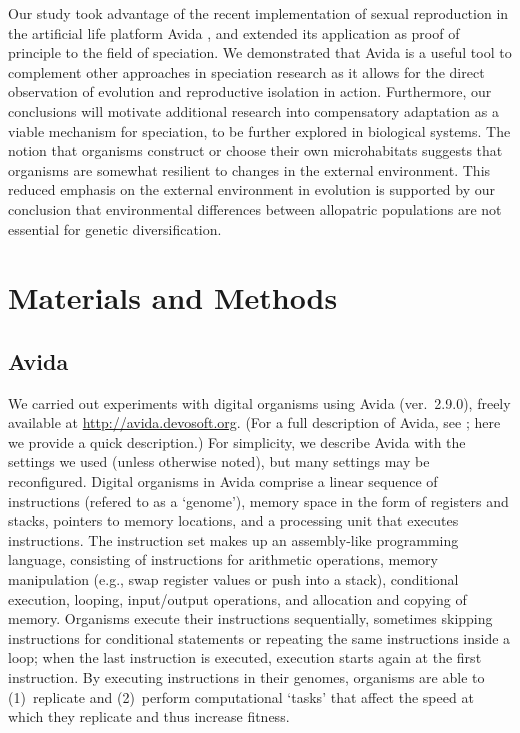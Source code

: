\documentclass[11pt]{article}
\begin{document}
Our study took advantage
of the recent implementation of sexual reproduction
in the artificial life platform Avida \cite{mis06},
and extended its application
as proof of principle to the field of speciation.
%
We demonstrated that Avida is a useful tool to complement
other approaches in speciation research as it allows for
the direct observation of evolution and reproductive isolation in action.
%
Furthermore, our conclusions will motivate additional research
into compensatory adaptation as a viable mechanism for speciation,
to be further explored in biological systems.
%
The notion that organisms construct or choose
their own microhabitats \cite{lew00}
suggests that organisms are somewhat
resilient to changes in the external environment.
%
This reduced emphasis on the external environment in evolution
is supported by our conclusion that environmental differences
between allopatric populations are not essential for genetic diversification.



\section*{Materials and Methods}

\subsection*{Avida}

We carried out experiments with digital organisms using Avida (ver.~2.9.0),
freely available at \url{http://avida.devosoft.org}.
%
(For a full description of Avida, see \cite{ofr04};
here we provide a quick description.)
%
For simplicity, we describe Avida with the settings we used
(unless otherwise noted), but many settings may be reconfigured.
%
Digital organisms in Avida comprise a linear sequence of instructions
(refered to as a `genome'), memory space in the form of registers and stacks,
pointers to memory locations, and a processing unit that executes instructions.
%
The instruction set makes up an assembly-like programming language,
consisting of instructions for arithmetic operations,
memory manipulation (e.g., swap register values or push into a stack),
conditional execution, looping, input/output operations,
and allocation and copying of memory.
%
Organisms execute their instructions sequentially,
sometimes skipping instructions for conditional statements
or repeating the same instructions inside a loop;
when the last instruction is executed,
execution starts again at the first instruction.
%
By executing instructions in their genomes,
organisms are able to (1)~replicate and (2)~perform computational `tasks'
that affect the speed at which they replicate and thus increase fitness.
\end{document}
